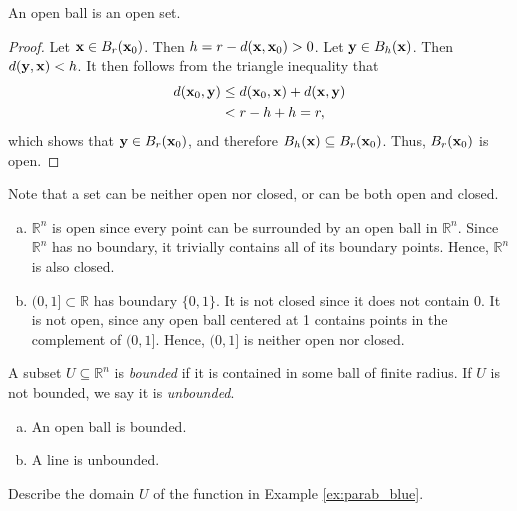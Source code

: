 \documentclass[12pt,letterpaper,reqno]{article}
\numberwithin{equation}{section}
\newcommand{\R}{\ensuremath{\mathbb R}}
\newcommand{\bx}{{\bf x}}
\newcommand{\by}{{\bf y}}
\begin{document}
{\begin{prop}\label{prop:open_ball_is_open}
An open ball is an open set.	
\end{prop}

\begin{proof}
	Let $\bx \in B_r(\bx_0)$. Then $h=r-d(\bx,\bx_0)>0$. Let $\by \in B_h(\bx)$. Then $d(\by,\bx)<h$. It then follows from the triangle inequality that
	\begin{align*}
		d(\bx_0,\by) &\leq d(\bx_0,\bx)+d(\bx,\by) \\
		&<r-h+h=r,
	\end{align*}
	which shows that $\by \in B_r(\bx_0)$, and therefore $B_h(\bx) \subseteq B_r(\bx_0)$. Thus, $B_r(\bx_0)$ is open.
\end{proof}

Note that a set can be neither open nor closed, or can be both open and closed.

\begin{example}
\begin{enumerate}[(a)]
	\item $\R^n$ is open since every point can be surrounded by an open ball in $\R^n$. Since $\R^n$ has no boundary, it trivially contains all of its boundary points. Hence, $\R^n$ is also closed.
	\item $(0,1] \subset \R$ has boundary $\{0,1\}$. It is not closed since it does not contain 0. It is not open, since any open ball centered at 1 contains points in the complement of $(0,1]$. Hence, $(0,1]$ is neither open nor closed.
\end{enumerate}	
\end{example}

\begin{defn}
	A subset $U \subseteq \R^n$ is \emph{bounded} if it is contained in some ball of finite radius. If $U$ is not bounded, we say it is \emph{unbounded}.
\end{defn}

\begin{example}
\begin{enumerate}[(a)]
	\item An open ball is bounded.
	\item A line is unbounded.
\end{enumerate}	
\end{example}

\begin{exercise}
Describe the domain $U$ of the function in Example	\ref{ex:parab_blue}.
\end{exercise}

}
\end{document}
